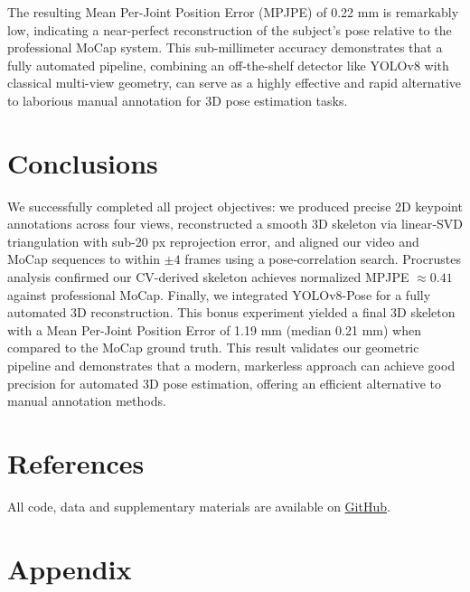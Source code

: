 \documentclass[11pt,a4paper]{article}
\begin{document}
The resulting Mean Per-Joint Position Error (MPJPE) of 0.22 mm is remarkably low, indicating a near-perfect reconstruction of the subject’s pose relative to the professional MoCap system. This sub-millimeter accuracy demonstrates that a fully automated pipeline, combining an off-the-shelf detector like YOLOv8 with classical multi-view geometry, can serve as a highly effective and rapid alternative to laborious manual annotation for 3D pose estimation tasks.

\section*{Conclusions}
We successfully completed all project objectives: we produced precise 2D keypoint annotations across four views, reconstructed a smooth 3D skeleton via linear‐SVD triangulation with sub-20 px reprojection error, and aligned our video and MoCap sequences to within \(\pm4\) frames using a pose‐correlation search. Procrustes analysis confirmed our CV-derived skeleton achieves normalized MPJPE \(\approx0.41\) against professional MoCap. Finally, we integrated YOLOv8-Pose for a fully automated 3D reconstruction. This bonus experiment yielded a final 3D skeleton with a Mean Per-Joint Position Error of 1.19 mm (median 0.21 mm) when compared to the MoCap ground truth. This result validates our geometric pipeline and demonstrates that a modern, markerless approach can achieve good precision for automated 3D pose estimation, offering an efficient alternative to manual annotation methods.

\section*{References}
All code, data and supplementary materials are available on
\href{https://github.com/gvazzolerunitn/cv-mocap_8}{GitHub}.

\clearpage

\section*{Appendix}

\vspace{2cm}
\end{document}
